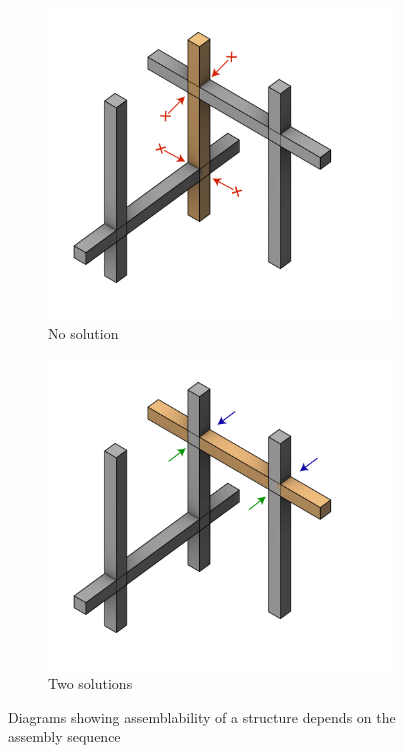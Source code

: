 \begin{figure}[!h]
    \centering
    \begin{subfigure}[b]{0.49\textwidth}
        \centering
        \includegraphics[width=\textwidth]{images/05/assembility-arrows-05.jpg}
        \caption{No solution}
        \label{fig:assemblability-no-solutions}
    \end{subfigure}
    \hfill
    \begin{subfigure}[b]{0.49\textwidth}
        \centering
        \includegraphics[width=\textwidth]{images/05/assembility-arrows-06.jpg}
        \caption{Two solutions}
        \label{fig:assemblability-two-solutions}
    \end{subfigure}
    \caption{Diagrams showing assemblability of a structure depends on the assembly sequence} 
    \label{fig:assemblability-depends-on-sequence}
\end{figure}


